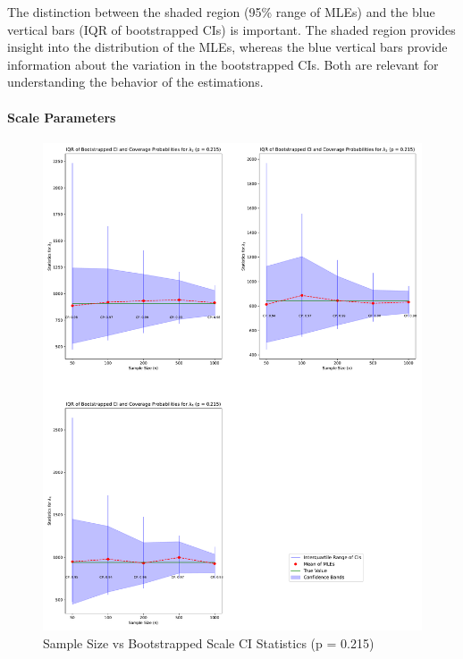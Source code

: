 \documentclass[
]{article}
\begin{document}
The distinction between the shaded region (95\% range of MLEs) and the
blue vertical bars (IQR of bootstrapped CIs) is important. The shaded
region provides insight into the distribution of the MLEs, whereas the
blue vertical bars provide information about the variation in the
bootstrapped CIs. Both are relevant for understanding the behavior of
the estimations.

\hypertarget{scale-parameters}{%
\paragraph*{Scale Parameters}\label{scale-parameters}}

\begin{figure}

{\centering \includegraphics{image/plot-n-vs-stats-p215-scale} 

}

\caption{Sample Size vs Bootstrapped Scale CI Statistics (p = 0.215)}\label{fig:samp-size-n-vs-stats-p215-scale}
\end{figure}
\end{document}
